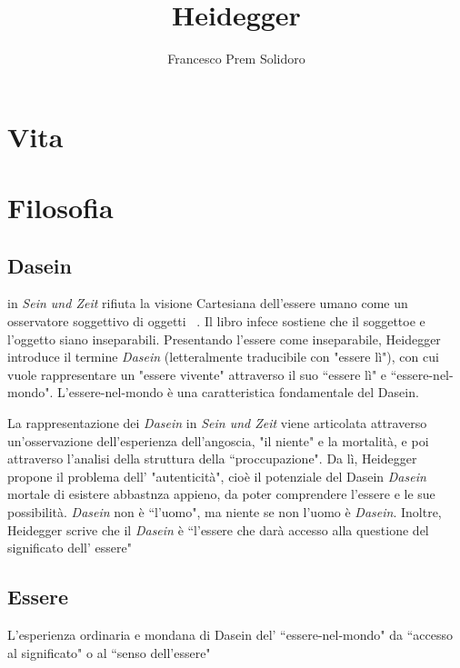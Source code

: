 \documentclass{article}
\title{Heidegger}
\author{Francesco Prem Solidoro}
\begin{document}
\maketitle
\tableofcontents
\section{Vita} %
\label{sec:VIta}

\section{Filosofia} %
\label{sec:Filosofia}
\subsection{Dasein} %
\label{sub:Dasein}
\textcite{sein_und_zeit_heidegger} in \textit{Sein und Zeit} rifiuta la visione Cartesiana dell'essere umano come un osservatore soggettivo di oggetti ~\cite{Horrigan-Kelly_Heidegger}. Il libro infece sostiene che il soggettoe e l'oggetto siano inseparabili. Presentando l'essere come inseparabile, Heidegger introduce il termine \textit{Dasein} (letteralmente traducibile con "essere lì"), con cui vuole rappresentare un "essere vivente" attraverso il suo ``essere lì" e ``essere-nel-mondo". L'essere-nel-mondo è una caratteristica fondamentale del Dasein.

La rappresentazione dei \textit{Dasein} in \textit{Sein und Zeit} viene articolata attraverso un'osservazione dell'esperienza dell'angoscia, "il niente" e la mortalità, e poi attraverso l'analisi della struttura della ``proccupazione". Da lì, Heidegger propone il problema dell' "autenticità", cioè il potenziale del Dasein \textit{Dasein} mortale di esistere abbastnza appieno, da poter comprendere l'essere e le sue possibilità. \textit{Dasein} non è ``l'uomo", ma niente se non l'uomo è \textit{Dasein}. Inoltre, Heidegger scrive che il \textit{Dasein} è ``l'essere che darà accesso alla questione del significato dell' essere" ~\cite{Peter_caws_Heidegger_Sartre}

\subsection{Essere} %
\label{sub:Essere}
L'esperienza ordinaria e mondana di Dasein del' ``essere-nel-mondo" da ``accesso al significato" o al ``senso dell'essere" 



\printbibliography
\end{document}
